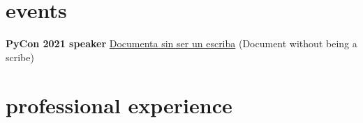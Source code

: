 \documentclass[]{friggeri-cv}
\begin{document}
\section{events}

\textbf{\headingfont PyCon 2021 speaker} \href{https://www.youtube.com/watch?v=U8SP_Osd8ZY}{Documenta sin ser un escriba} (Document without being a scribe)

\clearpage
\section{professional experience}
\end{document}

